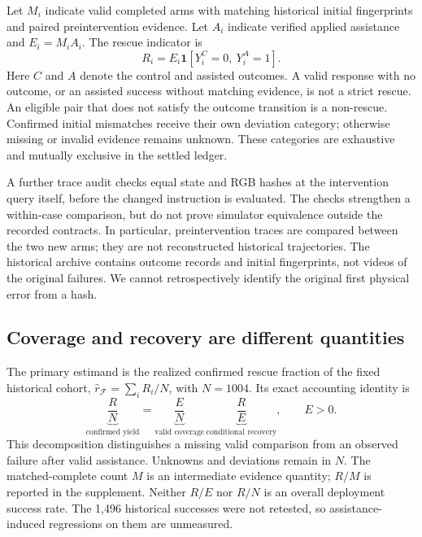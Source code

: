 \documentclass[10pt,twocolumn,letterpaper]{article}
\newcommand{\F}{\mathcal F}
\newcommand{\ind}{\mathbf 1}
\begin{document}
Let $M_i$ indicate valid completed arms with matching historical initial fingerprints and paired preintervention evidence. Let $A_i$ indicate verified applied assistance and $E_i=M_iA_i$. The rescue indicator is
\begin{equation}
R_i=E_i\ind[Y_i^{C}=0,\ Y_i^{A}=1].
\label{eq:rescue}
\end{equation}
Here $C$ and $A$ denote the control and assisted outcomes. A valid response with no outcome, or an assisted success without matching evidence, is not a strict rescue. An eligible pair that does not satisfy the outcome transition is a non-rescue. Confirmed initial mismatches receive their own deviation category; otherwise missing or invalid evidence remains unknown. These categories are exhaustive and mutually exclusive in the settled ledger.

A further trace audit checks equal state and RGB hashes at the intervention query itself, before the changed instruction is evaluated. The checks strengthen a within-case comparison, but do not prove simulator equivalence outside the recorded contracts. In particular, preintervention traces are compared between the two new arms; they are not reconstructed historical trajectories. The historical archive contains outcome records and initial fingerprints, not videos of the original failures. We cannot retrospectively identify the original first physical error from a hash.

\subsection{Coverage and recovery are different quantities}
The primary estimand is the realized confirmed rescue fraction of the fixed historical cohort, $\widehat r_{\F}=\sum_iR_i/N$, with $N=1004$. Its exact accounting identity is
\begin{equation}
\underbrace{\frac{R}{N}}_{\text{confirmed yield}}
=\underbrace{\frac{E}{N}}_{\text{valid coverage}}\,
\underbrace{\frac{R}{E}}_{\text{conditional recovery}},\qquad E>0.
\label{eq:rates}
\end{equation}
This decomposition distinguishes a missing valid comparison from an observed failure after valid assistance. Unknowns and deviations remain in $N$. The matched-complete count $M$ is an intermediate evidence quantity; $R/M$ is reported in the supplement. Neither $R/E$ nor $R/N$ is an overall deployment success rate. The 1,496 historical successes were not retested, so assistance-induced regressions on them are unmeasured.
\end{document}
